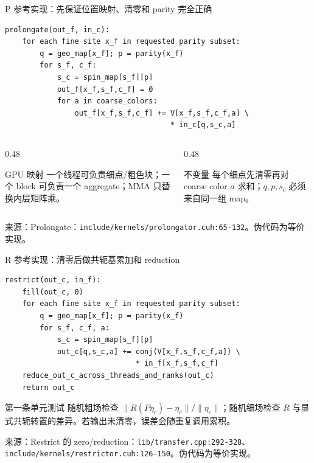 \documentclass[UTF8,aspectratio=169,11pt]{ctexbeamer}
\newcommand{\source}[1]{\vspace{0.05em}\par{\raggedright\scriptsize\color{muted}来源：#1\par}}
\newcommand{\codepath}[1]{\nolinkurl{#1}}
\begin{document}
\begin{frame}[fragile,t]{P 参考实现：先保证位置映射、清零和 parity 完全正确}
  \begin{lstlisting}[firstnumber=1]
prolongate(out_f, in_c):
    for each fine site x_f in requested parity subset:
        q = geo_map[x_f]; p = parity(x_f)
        for s_f, c_f:
            s_c = spin_map[s_f][p]
            out_f[x_f,s_f,c_f] = 0
            for a in coarse_colors:
                out_f[x_f,s_f,c_f] += V[x_f,s_f,c_f,a] \
                                      * in_c[q,s_c,a]
  \end{lstlisting}
  \vspace{0.10cm}
  \begin{columns}[T,totalwidth=\textwidth]
    \begin{column}{0.48\textwidth}
      \begin{block}{GPU 映射}
        一个线程可负责细点/粗色块；一个 block 可负责一个 aggregate；MMA 只替换内层矩阵乘。
      \end{block}
    \end{column}
    \begin{column}{0.48\textwidth}
      \begin{alertblock}{不变量}
        每个细点先清零再对 coarse color \(a\) 求和；\(q,p,s_c\) 必须来自同一组 map。
      \end{alertblock}
    \end{column}
  \end{columns}
  \source{Prolongate：\codepath{include/kernels/prolongator.cuh:65-132}。伪代码为等价实现。}
\end{frame}

\begin{frame}[fragile,t]{R 参考实现：清零后做共轭基累加和 reduction}
  \begin{lstlisting}[firstnumber=1]
restrict(out_c, in_f):
    fill(out_c, 0)
    for each fine site x_f in requested parity subset:
        q = geo_map[x_f]; p = parity(x_f)
        for s_f, c_f, a:
            s_c = spin_map[s_f][p]
            out_c[q,s_c,a] += conj(V[x_f,s_f,c_f,a]) \
                              * in_f[x_f,s_f,c_f]
    reduce_out_c_across_threads_and_ranks(out_c)
    return out_c
  \end{lstlisting}
  \vspace{0.10cm}
  \begin{alertblock}{第一条单元测试}
    随机粗场检查 \(\|R(P\eta_c)-\eta_c\|/\|\eta_c\|\)；随机细场检查 \(R\) 与显式共轭转置的差异。若输出未清零，误差会随重复调用累积。
  \end{alertblock}
  \source{Restrict 的 zero/reduction：\codepath{lib/transfer.cpp:292-328}、\codepath{include/kernels/restrictor.cuh:126-150}。伪代码为等价实现。}
\end{frame}
\end{document}
